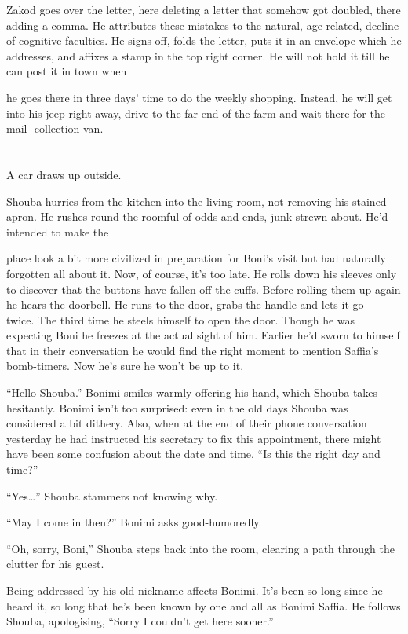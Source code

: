 \documentclass[twoside,11pt]{book}
\begin{document}
Zakod goes over the letter, here deleting a letter that somehow got doubled, there adding a comma. He attributes these
mistakes to the natural, age-related, decline of cognitive faculties. He signs off, folds the letter, puts it in an
envelope which he addresses, and affixes a stamp in the top right corner. He will not hold it till he can post it in
town when

he goes there in three days' time to do the weekly shopping. Instead, he will get into his jeep right away, drive to the
far end of the farm and wait there for the mail- collection van.



\chapter{}

A car draws up outside.

Shouba hurries from the kitchen into the living room, not removing his stained apron. He rushes round the roomful of
odds and ends, junk strewn about. He'd intended to make the

place look a bit more civilized in preparation for Boni's visit but had naturally forgotten all about it. Now, of
course, it's too late. He rolls down his sleeves only to discover that the buttons have fallen off the cuffs. Before
rolling them up again he hears the doorbell. He runs to the door, grabs the handle and lets it go - twice. The third
time he steels himself to open the door. Though he was expecting Boni he freezes at the actual sight of him. Earlier
he'd sworn to himself that in their conversation he would find the right moment to mention Saffia's bomb-timers. Now
he's sure he won't be up to it.

``Hello Shouba.'' Bonimi smiles warmly offering his hand, which Shouba takes hesitantly.
Bonimi isn't too surprised: even in the old days Shouba was considered a bit dithery. Also, when at the end of their
phone conversation yesterday he had instructed his secretary to fix this appointment, there might have been some
confusion about the date and time. ``Is this the right day and time?''

``Yes\dots'' Shouba stammers not knowing why.

``May I come in then?'' Bonimi asks good-humoredly.

``Oh, sorry, Boni,'' Shouba steps back into the room, clearing a path through the clutter for
his guest.

Being addressed by his old nickname affects Bonimi. It's been so long since he heard it, so long that he's been known
by one and all as Bonimi Saffia. He follows Shouba, apologising, ``Sorry I
couldn't get here sooner.''
\end{document}
